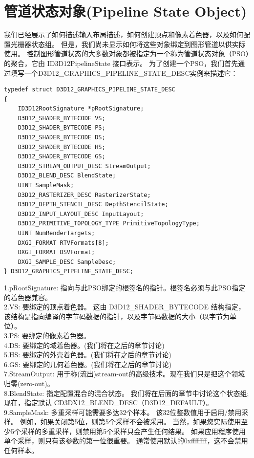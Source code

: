 \documentclass[11pt,a4paper,oldfontcommands]{memoir}
\begin{document}
{\section{管道状态对象(Pipeline State Object)}
\begin{flushleft}
我们已经展示了如何描述输入布局描述，如何创建顶点和像素着色器，以及如何配置光栅器状态组。 但是，我们尚未显示如何将这些对象绑定到图形管道以供实际使用。 控制图形管道状态的大多数对象都被指定为一个称为管道状态对象（PSO）的聚合，它由 ID3D12PipelineState 接口表示。 为了创建一个PSO，我们首先通过填写一个D3D12\_GRAPHICS\_PIPELINE\_STATE\_DESC实例来描述它：\\
\end{flushleft}
\begin{lstlisting}
typedef struct D3D12_GRAPHICS_PIPELINE_STATE_DESC
{
    ID3D12RootSignature *pRootSignature;
    D3D12_SHADER_BYTECODE VS;
    D3D12_SHADER_BYTECODE PS;
    D3D12_SHADER_BYTECODE DS;
    D3D12_SHADER_BYTECODE HS;
    D3D12_SHADER_BYTECODE GS;
    D3D12_STREAM_OUTPUT_DESC StreamOutput;
    D3D12_BLEND_DESC BlendState;
    UINT SampleMask;
    D3D12_RASTERIZER_DESC RasterizerState;
    D3D12_DEPTH_STENCIL_DESC DepthStencilState;
    D3D12_INPUT_LAYOUT_DESC InputLayout;
    D3D12_PRIMITIVE_TOPOLOGY_TYPE PrimitiveTopologyType;
    UINT NumRenderTargets;
    DXGI_FORMAT RTVFormats[8];
    DXGI_FORMAT DSVFormat;
    DXGI_SAMPLE_DESC SampleDesc;
} D3D12_GRAPHICS_PIPELINE_STATE_DESC;
\end{lstlisting}
\begin{flushleft}
1.pRootSignature: 指向与此PSO绑定的根签名的指针。根签名必须与此PSO指定的着色器兼容。\\
2.VS: 要绑定的顶点着色器。 这由 D3D12\_SHADER\_BYTECODE 结构指定，该结构是指向编译的字节码数据的指针，以及字节码数据的大小（以字节为单位）。\\
3.PS: 要绑定的像素着色器。\\
4.DS: 要绑定的域着色器。(我们将在之后的章节讨论)\\
5.HS: 要绑定的外壳着色器。(我们将在之后的章节讨论)\\
6.GS: 要绑定的几何着色器。(我们将在之后的章节讨论)\\
7.StreamOutput: 用于称(流出)stream-out的高级技术。现在我们只是把这个领域归零(zero-out)。\\
8.BlendState: 指定配置混合的混合状态。 我们将在后面的章节中讨论这个状态组; 现在，指定默认 CD3DX12\_BLEND\_DESC（D3D12\_DEFAULT）。\\
9.SampleMask: 多重采样可能需要多达32个样本。 该32位整数值用于启用/禁用采样。 例如，如果关闭第5位，则第5个采样不会被采用。 当然，如果您实际使用至少5个采样的多重采样，则禁用第5个采样只会产生任何结果。 如果应用程序使用单个采样，则只有该参数的第一位很重要。 通常使用默认的0xffffffff，这不会禁用任何样本。\\

\end{flushleft}}
\end{document}
